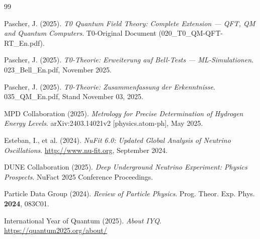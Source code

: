 	\begin{thebibliography}{99}
		
		Pascher, J. (2025). \textit{T0 Quantum Field Theory: Complete Extension --- QFT, QM and Quantum Computers}.
		T0-Original Document (020\_T0\_QM-QFT-RT\_En.pdf).
		
		Pascher, J. (2025). \textit{T0-Theorie: Erweiterung auf Bell-Tests --- ML-Simulationen}.
		023\_Bell\_En.pdf, November 2025.
		
		Pascher, J. (2025). \textit{T0-Theorie: Zusammenfassung der Erkenntnisse}.
		035\_QM\_En.pdf, Stand November 03, 2025.
		
		
		MPD Collaboration (2025). \textit{Metrology for Precise Determination of Hydrogen Energy Levels}.
		arXiv:2403.14021v2 [physics.atom-ph], May 2025.
		
		Esteban, I., et al. (2024). \textit{NuFit 6.0: Updated Global Analysis of Neutrino Oscillations}.
		\url{http://www.nu-fit.org}, September 2024.
		
		DUNE Collaboration (2025). \textit{Deep Underground Neutrino Experiment: Physics Prospects}.
		NuFact 2025 Conference Proceedings.
		
		Particle Data Group (2024). \textit{Review of Particle Physics}.
		Prog. Theor. Exp. Phys. \textbf{2024}, 083C01.
		
		International Year of Quantum (2025). \textit{About IYQ}.
		\url{https://quantum2025.org/about/}
		
	\end{thebibliography}
	